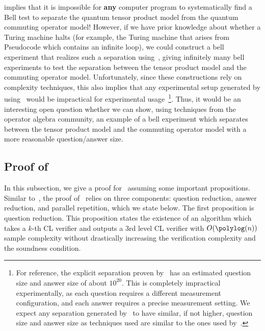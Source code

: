    implies that it is impossible for \textbf{any} computer program to systematically find a Bell test to separate the quantum tensor product model from the quantum commuting operator model! However, if we have prior knowledge about whether a Turing machine halts (for example, the Turing machine that arises from Pseudocode which contains an infinite loop), we could construct a bell experiment that realizes such a separation using~, giving infinitely many bell experiments to test the separation between the tensor product model and the commuting operator model. Unfortunately, since these constructions rely on complexity techniques, this also implies that any experimental setup generated by using~ would be impractical for experimental usage~\footnote{For reference, the explicit separation proven by~\cite{jiMIPRE2022a} has an estimated question size and answer size of about $10^{20}$. This is completely impractical experimentally, as each question requires a different measurement configuration, and each answer requires a precise measurement setting. We expect any separation generated by~ to have similar, if not higher, question size and answer size as techniques used are similar to the ones used by~\cite{jiMIPRE2022a}.}. Thus, it would be an interesting open question whether we can show, using techniques from the operator algebra community, an example of a bell experiment which separates between the tensor product model and the commuting operator model with a more reasonable question/answer size. 


\subsection{Proof of~} \label{sec:proofcompressiongame}

In this subsection, we give a proof for~ assuming some important propositions. Similar to~\cite[Theorem 12.1]{jiMIPRE2022a}, the proof of~ relies on three components: question reduction, answer reduction, and parallel repetition, which we state below. The first proposition is question reduction. This proposition states the existence of an algorithm which takes a $k$-th CL verifier and outputs a $3$rd level CL verifier with $O(\polylog(n))$ sample complexity without drastically increasing the verification complexity and the soundness condition.

